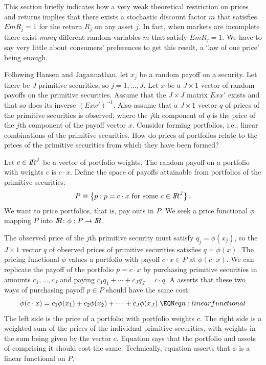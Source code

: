 This section briefly indicates how a very weak theoretical restriction on  prices and returns
implies that there exists a stochastic discount factor $m$ that satisfies
$E m R_j =1$ for the return $R_j$ on any asset $j$. In fact, when markets are incomplete there exist {\it many\/} different random variables
$m$ that satisfy $E m R_j =1$.  We have to say very little about consumers' preferences to get this result, a `law of one price' being
 enough.

Following Hansen and Jagannathan, let $x_j$ be a random payoff on a security.
Let there be $J$ primitive securities, so $j = 1, \ldots, J$.  Let
$x$ be a $J \times 1$  vector of random payoffs on the primitive securities.
Assume that the $J \times J$ matrix $E x x'$ exists and that so does its inverse
$(E x x')^{-1}$.  Also assume that
a $J \times 1$ vector $q$ of prices  of the primitive securities is observed,
where the $j$th component of $q$ is the price of the $j$th component of
the payoff vector $x$.  Consider forming portfolios, i.e., linear combinations of the primitive securities.
 How do  prices of portfolios
relate to the prices of the primitive securities from which they have been formed?

Let $c\in {I\kern-0.3em R}^J$ be a vector of portfolio weights.  The random payoff
on a portfolio with weights $c$ is $c \cdot x$.
Define the space of payoffs attainable from
portfolios of the primitive securities:
$$ P \equiv \left\{ p: p = c\cdot x \ {\rm for \ some} \ c \in {I\kern-0.3em R}^J\right\}.$$
We want to price  portfolios, that is, pay outs in $P$.
We seek a price functional $\phi$ mapping $P$ into ${I\kern-0.3em R}$:
$\phi: P \rightarrow {I\kern-0.3em R}$.


The observed price of the $j$th primitive security must satisfy  $q_j = \phi(x_j)$, so
the  $J \times 1$ vector $q$ of observed prices of primitive securities satisfies
 $q  = \phi(x)$.
The pricing functional $\phi$ values a portfolio with payoff $c \cdot x \in P$ at   $\phi(c\cdot x)$.  We can replicate the payoff of the portfolio $p = c \cdot x$ by purchasing primitive securities in amounts
$c_1, \ldots, c_J$ and paying
  $c_1 q_1 + \cdots + c_J q_J = c \cdot q$.  A  {\it {}\/} asserts that these two ways of purchasing payoff $p \in P$ should have the same cost:
$$  \phi(c \cdot x) = c_1 \phi(x_1) + c_2 \phi(x_2) + \cdots + c_J \phi(x_J) .\EQN eqn:linearfunctional $$
The left side is the price of a portfolio with portfolio weights $c$. The right side is a weighted sum of the prices of the
individual primitive securities, with weights in the sum being given by the vector $c$.  Equation  says that
the  portfolio and  assets of comprising it  should cost the same.  Technically,  equation   asserts that
  $\phi$ is a linear functional on $P$.

